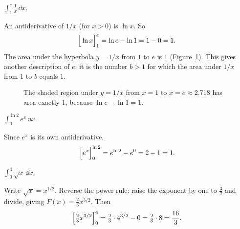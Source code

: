\begin{example}\label{ch21:ex-recip}
$\displaystyle \int_1^{e} \frac{1}{x}\,\dd x.$

An antiderivative of $1/x$ (for $x>0$) is $\ln x$. So
\[
  \Big[\ln x\Big]_{1}^{e} = \ln e - \ln 1 = 1 - 0 = 1.
\]
The area under the hyperbola $y=1/x$ from $1$ to $e$ is $1$
(Figure~\ref{ch21:fig-recip}). This gives another description of $e$: it is the
number $b>1$ for which the area under $1/x$ from $1$ to $b$ equals $1$.

\begin{figure}[htbp]
\centering
{}
\caption{The shaded region under $y=1/x$ from $x=1$ to $x=e\approx 2.718$ has area
exactly $1$, because $\ln e-\ln 1=1$.}
\label{ch21:fig-recip}
\end{figure}
\end{example}

\begin{example}\label{ch21:ex-exp}
$\displaystyle \int_0^{\ln 2} e^{x}\,\dd x.$

Since $e^x$ is its own antiderivative,
\[
  \Big[e^x\Big]_{0}^{\ln 2} = e^{\ln 2} - e^{0} = 2 - 1 = 1.
\]
\end{example}

\begin{example}\label{ch21:ex-sqrt}
$\displaystyle \int_0^{4} \sqrt{x}\,\dd x.$

Write $\sqrt{x}=x^{1/2}$. Reverse the power rule: raise the exponent by one to
$\tfrac32$ and divide, giving $F(x)=\tfrac{2}{3}x^{3/2}$. Then
\[
  \Big[\tfrac23 x^{3/2}\Big]_{0}^{4} = \tfrac23\cdot 4^{3/2} - 0
  = \tfrac23\cdot 8 = \frac{16}{3}.
\]
\end{example}

